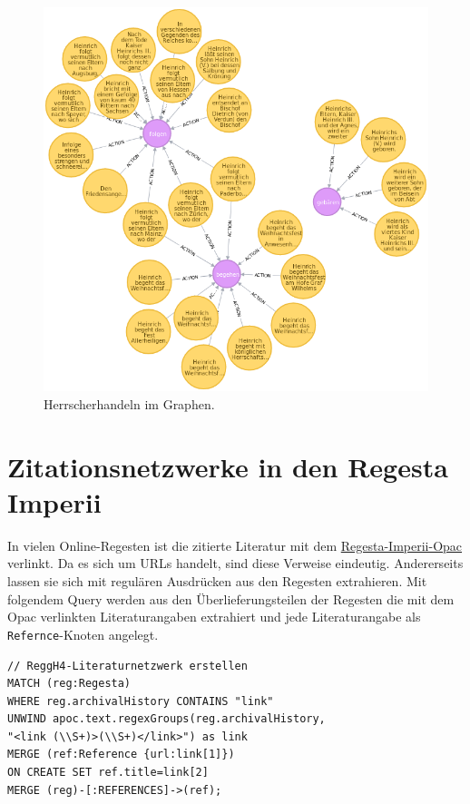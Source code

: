 \documentclass[ngerman,]{scrreprt}
\begin{document}
\begin{figure}
\centering
\includegraphics{Bilder/RI2Graph/ReggH4-Action.png}
\caption{Herrscherhandeln im Graphen.}
\label{herrscherhandeln}
\end{figure}

\hypertarget{zitationsnetzwerke-in-den-regesta-imperii}{%
\section{Zitationsnetzwerke in den Regesta Imperii}\label{zitationsnetzwerke-in-den-regesta-imperii}}

In vielen Online-Regesten ist die zitierte Literatur mit dem \href{http://opac.regesta-imperii.de/lang_de/}{Regesta-Imperii-Opac} verlinkt. Da es sich um URLs handelt, sind diese Verweise eindeutig. Andererseits lassen sie sich mit regulären Ausdrücken aus den Regesten extrahieren. Mit folgendem Query werden aus den Überlieferungsteilen der Regesten die mit dem Opac verlinkten Literaturangaben extrahiert und jede Literaturangabe als \texttt{Refernce}-Knoten angelegt.

\begin{verbatim}
// ReggH4-Literaturnetzwerk erstellen
MATCH (reg:Regesta)
WHERE reg.archivalHistory CONTAINS "link"
UNWIND apoc.text.regexGroups(reg.archivalHistory,
"<link (\\S+)>(\\S+)</link>") as link
MERGE (ref:Reference {url:link[1]})
ON CREATE SET ref.title=link[2]
MERGE (reg)-[:REFERENCES]->(ref);
\end{verbatim}
\end{document}
